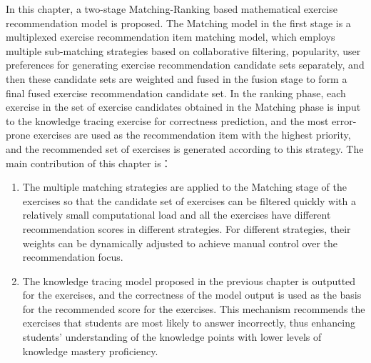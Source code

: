 In this chapter, a two-stage Matching-Ranking based mathematical exercise recommendation model is proposed. The Matching model in the first stage is a multiplexed exercise recommendation item matching model, which employs multiple sub-matching strategies based on collaborative filtering, popularity, user preferences for generating exercise recommendation candidate sets separately, and then these candidate sets are weighted and fused in the fusion stage to form a final fused exercise recommendation candidate set. In the ranking phase, each exercise in the set of exercise candidates obtained in the Matching phase is input to the knowledge tracing exercise for correctness prediction, and the most error-prone exercises are used as the recommendation item with the highest priority, and the recommended set of exercises is generated according to this strategy.
The main contribution of this chapter is：
\begin{enumerate}
  \item The multiple matching strategies are applied to the Matching stage of the exercises so that the candidate set of exercises can be filtered quickly with a relatively small computational load and all the exercises have different recommendation scores in different strategies. For different strategies, their weights can be dynamically adjusted to achieve manual control over the recommendation focus.
  \item The knowledge tracing model proposed in the previous chapter is outputted for the exercises, and the correctness of the model output is used as the basis for the recommended score for the exercises. This mechanism recommends the exercises that students are most likely to answer incorrectly, thus enhancing students' understanding of the knowledge points with lower levels of knowledge mastery proficiency.
\end{enumerate}